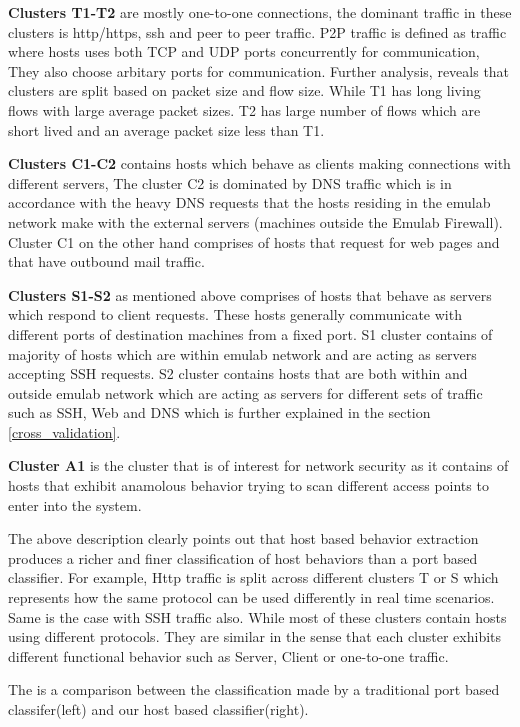 \textbf{Clusters T1-T2} are mostly one-to-one connections, the dominant traffic in these clusters is http/https, ssh and peer to peer traffic. P2P traffic is defined as traffic where hosts uses both TCP and UDP ports concurrently for communication, They also choose arbitary ports for communication. Further analysis, reveals that clusters are split based on packet size and flow size.
While T1 has long living flows with large average packet sizes. T2 has large number of flows which are short lived and an average packet size less than T1.

\textbf{Clusters C1-C2} contains hosts which behave as clients  making connections with different servers, The cluster C2 is dominated by DNS traffic which is in accordance with the heavy DNS requests that the hosts residing in the emulab network make with the external servers (machines outside the Emulab Firewall). Cluster C1 on the other hand comprises of hosts that request for web pages and that have outbound mail traffic.

\textbf{Clusters S1-S2} as mentioned above comprises of hosts that behave as servers which respond to client requests. These hosts generally communicate with different ports of destination machines from a fixed port. S1 cluster contains of majority of hosts which are within emulab network and are acting as servers accepting SSH requests. S2 cluster contains hosts that are both within and outside emulab network which are acting as servers for different sets of traffic such as SSH, Web and DNS which is further explained in the section \ref{cross_validation}. 

\textbf{Cluster A1} is the cluster that is of interest for network security as it contains of hosts that exhibit anamolous behavior trying to scan different access points to enter into the system.

The above description clearly points out that host based behavior extraction produces a richer and finer classification of host behaviors than a port based classifier. For example, Http traffic is split across different clusters T or S which represents how the same protocol can be used differently in real time scenarios. Same is the case with SSH traffic also. While most of these clusters contain hosts using different protocols. They are similar in the sense that each cluster exhibits different functional behavior such as Server, Client or one-to-one traffic.

The  is a comparison between the classification made by a traditional port based classifer(left) and our host based classifier(right).

